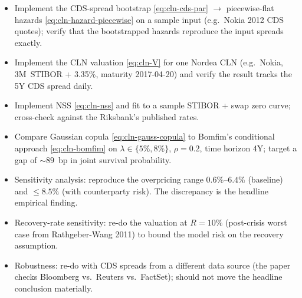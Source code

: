 \documentclass[11pt,a4paper]{article}
\begin{document}
\begin{todobox}
\begin{itemize}[noitemsep]
  \item Implement the CDS-spread bootstrap \eqref{eq:cln-cds-par}
        $\to$ piecewise-flat hazards \eqref{eq:cln-hazard-piecewise}
        on a sample input (e.g.\ Nokia 2012 CDS quotes); verify that
        the bootstrapped hazards reproduce the input spreads
        exactly.
  \item Implement the CLN valuation \eqref{eq:cln-V} for one Nordea
        CLN (e.g.\ Nokia, 3M~STIBOR + 3.35\%, maturity 2017-04-20)
        and verify the result tracks the 5Y CDS spread daily.
  \item Implement NSS \eqref{eq:cln-nss} and fit to a sample STIBOR +
        swap zero curve; cross-check against the Riksbank's
        published rates.
  \item Compare Gaussian copula \eqref{eq:cln-gauss-copula} to
        Bomfim's conditional approach \eqref{eq:cln-bomfim} on
        $\lambda \in \{5\%, 8\%\}$, $\rho = 0.2$, time horizon 4Y;
        target a gap of $\sim 89$~bp in joint survival probability.
  \item Sensitivity analysis: reproduce the overpricing range
        $0.6\%$--$6.4\%$ (baseline) and $\le 8.5\%$ (with counterparty
        risk). The discrepancy is the headline empirical finding.
  \item Recovery-rate sensitivity: re-do the valuation at $R = 10\%$
        (post-crisis worst case from Rathgeber-Wang 2011) to bound
        the model risk on the recovery assumption.
  \item Robustness: re-do with CDS spreads from a different data
        source (the paper checks Bloomberg vs.\ Reuters vs.\
        FactSet); should not move the headline conclusion materially.
\end{itemize}
\end{todobox}
\end{document}
